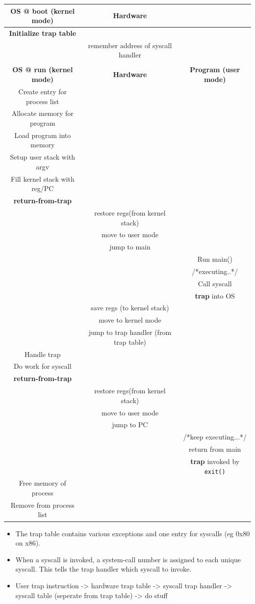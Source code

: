 \documentclass[11pt, a4paper]{article}
\theoremstyle{definition}
\theoremstyle{remark}
\begin{document}
\begin{center}
\small
\begin{tabular}{c c c}
\textbf{OS @ boot (kernel mode)} & \textbf{Hardware} & \\
\hline 
\textbf{Initialize trap table} & & \\
& remember address of syscall handler & \\ 
\\ 
\textbf{OS @ run (kernel mode)} & \textbf{Hardware} & \textbf{Program (user mode)} \\ 
\hline
Create entry for process list & & \\
Allocate memory for program & & \\ 
Load program into memory & & \\ 
Setup user stack with argv & & \\ 
Fill kernel stack with reg/PC & &\\
\textbf{return-from-trap} & & \\
& restore regs(from kernel stack) & \\ 
& move to user mode & \\ 
& jump to main & \\ 
& & Run main() \\ 
& & /*executing..*/ \\ 
& & Call syscall \\ 
& & \textbf{trap} into OS \\ 
& save regs (to kernel stack) & \\ 
& move to kernel mode & \\ 
& jump to trap handler (from trap table) & \\ 
Handle trap & & \\ 
Do work for syscall & & \\ 
\textbf{return-from-trap} & & \\ 
& restore regs(from kernel stack) & \\ 
& move to user mode & \\ 
& jump to PC & \\
& & /*keep executing...*/ \\ 
& & return from main \\ 
& & \textbf{trap} invoked by \texttt{exit()} \\ 
Free memory of process & & \\ 
Remove from process list & &  
\end{tabular}
\end{center}
\begin{itemize}
  \item The trap table contains various exceptions and one entry for syscalls (eg 0x80 on x86).
  \item When a syscall is invoked, a system-call number is assigned to each unique syscall. This tells the trap handler which syscall to invoke.
  \item User trap instruction -> hardware trap table -> syscall trap handler -> syscall table (seperate from trap table) -> do stuff
\end{itemize}
\end{document}
